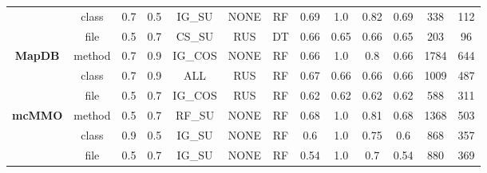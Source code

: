 \begin{table}[H]
{\begin{tabular}{@{}ccccccccccccc@{}}
                                                         & class                  & 0.7        & 0.5           & IG\_SU                   & NONE                       & RF             & 0.69               & 1.0             & 0.82       & 0.69              & 338                & 112           \\
                                                         & file                   & 0.5        & 0.7           & CS\_SU                   & RUS                        & DT             & 0.66               & 0.65            & 0.66       & 0.65              & 203                & 96            \\
                                                         \hline
\multirow{3}{*}{\textbf{MapDB}}                          & method                 & 0.7        & 0.9           & IG\_COS                  & NONE                       & RF             & 0.66               & 1.0             & 0.8        & 0.66              & 1784               & 644           \\
                                                         & class                  & 0.7        & 0.9           & ALL                      & RUS                        & RF             & 0.67               & 0.66            & 0.66       & 0.66              & 1009               & 487           \\
                                                         & file                   & 0.5        & 0.7           & IG\_COS                  & RUS                        & RF             & 0.62               & 0.62            & 0.62       & 0.62              & 588                & 311           \\
                                                         \hline
\multirow{3}{*}{\textbf{mcMMO}}                          & method                 & 0.5        & 0.7           & RF\_SU                   & NONE                       & RF             & 0.68               & 1.0             & 0.81       & 0.68              & 1368               & 503           \\
                                                         & class                  & 0.9        & 0.5           & IG\_SU                   & NONE                       & RF             & 0.6                & 1.0             & 0.75       & 0.6               & 868                & 357           \\
                                                         & file                   & 0.5        & 0.7           & IG\_SU                   & NONE                       & RF             & 0.54               & 1.0             & 0.7        & 0.54              & 880                & 369           \\

\end{tabular}}
\end{table}
